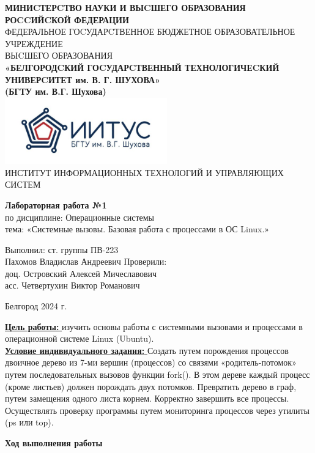 \documentclass[a4paper,14pt]{extarticle}
\newcommand\textbox[1]{
	\parbox{.45\textwidth}{#1}
}
\begin{document}
\begin{center}
    \small{
        \textbf{МИНИCТЕРCТВО НАУКИ И ВЫCШЕГО ОБРАЗОВАНИЯ РОCCИЙCКОЙ ФЕДЕРАЦИИ}\\
        ФЕДЕРАЛЬНОЕ ГОCУДАРCТВЕННОЕ БЮДЖЕТНОЕ ОБРАЗОВАТЕЛЬНОЕ УЧРЕЖДЕНИЕ\\ВЫCШЕГО ОБРАЗОВАНИЯ \\
        \textbf{«БЕЛГОРОДCКИЙ ГОCУДАРCТВЕННЫЙ ТЕХНОЛОГИЧЕCКИЙ\\УНИВЕРCИТЕТ им. В. Г. ШУХОВА»\\ (БГТУ им. В.Г. Шухова)} \\
        \bigbreak
        \includegraphics[width=70mm]{log}\\
        ИНСТИТУТ ИНФОРМАЦИОННЫХ ТЕХНОЛОГИЙ И УПРАВЛЯЮЩИХ СИСТЕМ\\}
\end{center}

\vfill
\begin{center}
    \large{
        \textbf{
            Лабораторная работа №1}}\\
    \normalsize{
        по дисциплине: Операционные системы \\
        тема: «Системные вызовы. Базовая работа с процессами в ОС Linux.»}
\end{center}
\vfill
\hfill\textbox{
    Выполнил: ст. группы ПВ-223\\Пахомов Владислав Андреевич
    \bigbreak
    Проверили: \\доц. Островский Алексей Мичеславович\\
    асс. Четвертухин Виктор Романович
}
\vfill\begin{center}
    Белгород 2024 г.
\end{center}
\newpage
\underline{\textbf{Цель работы: }}изучить основы работы с системными вызовами и процессами в операционной
системе Linux (Ubuntu).\\
\underline{\textbf{Условие индивидуального задания: }}Создать путем порождения процессов двоичное дерево из 7-ми вершин (процессов) со
связями «родитель-потомок» путем последовательных вызовов функции fork(). В этом дереве
каждый процесс (кроме листьев) должен порождать двух потомков. Превратить дерево в граф,
путем замещения одного листа корнем. Корректно завершить все процессы. Осуществлять
проверку программы путем мониторинга процессов через утилиты (ps или top).\\
\begin{center}
\textbf{Ход выполнения работы}
\end{center}
\end{document}
